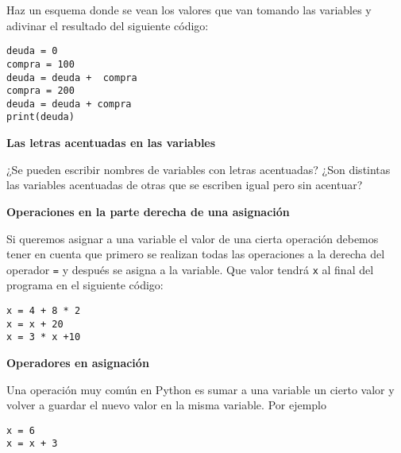 \documentclass[a4paper, 11pt]{scrartcl}
\newenvironment{code}{\begin{tcolorbox}[colback=red!2!white]}{\end{tcolorbox}}
\begin{document}
Haz un esquema donde se vean los valores que van tomando las variables y adivinar el resultado del siguiente código:

\smallskip

\begin{code}

\begin{verbatim}
deuda = 0
compra = 100
deuda = deuda +  compra
compra = 200
deuda = deuda + compra
print(deuda)
\end{verbatim}

\end{code}





 \noindent\textbf{\sffamily \dag{} Las letras acentuadas en las variables}
 
 ¿Se pueden escribir nombres de variables con letras acentuadas? ¿Son distintas las variables acentuadas de otras que se escriben igual pero sin acentuar?
 
 
 




\noindent\textbf{\sffamily  \dag{} Operaciones en la parte derecha de una asignación}

Si queremos asignar a una variable el valor de una cierta operación debemos tener en cuenta que primero se realizan todas las operaciones a la derecha del operador \verb|=| y después se asigna a la variable. Que valor tendrá \verb|x| al final del programa en el siguiente código:

\smallskip

\begin{code}

\begin{verbatim}
x = 4 + 8 * 2
x = x + 20
x = 3 * x +10
\end{verbatim}

\end{code}






\noindent\textbf{\sffamily \dag{} Operadores en asignación}

Una operación muy común en Python es sumar a una variable un cierto valor y volver a guardar el nuevo valor en la misma variable. Por ejemplo

\smallskip

\begin{code}

\begin{verbatim}
x = 6
x = x + 3
\end{verbatim}

\end{code}
\end{document}
